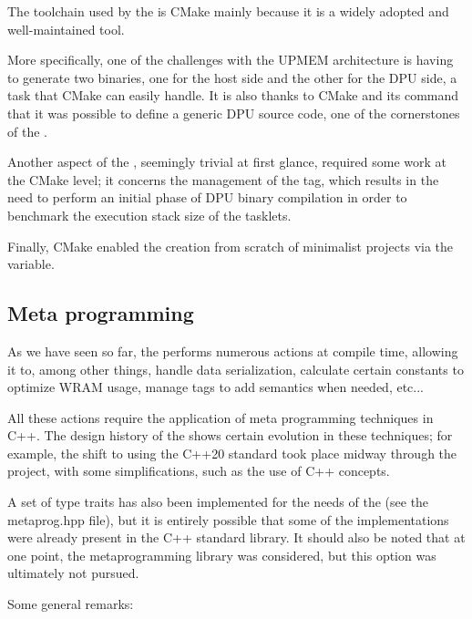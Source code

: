 The toolchain used by the \BPL is CMake mainly because it is a widely adopted and well-maintained tool.

More specifically, one of the challenges with the UPMEM architecture is having to generate two binaries, one for the host side and the other for the DPU side, a task that CMake can easily handle. It is also thanks to CMake and its  command that it was possible to define a generic DPU source code, one of the cornerstones of the \BPL.

Another aspect of the \BPL, seemingly trivial at first glance, required some work at the CMake level; it concerns the management of the  tag, which results in the need to perform an initial phase of DPU binary 
compilation in order to benchmark the execution stack size of the tasklets.

Finally, CMake enabled the creation from scratch of minimalist \BPL projects via the  variable.

\subsection{Meta programming}

As we have seen so far, the \BPL performs numerous actions at compile time, allowing it to, among other things, handle data serialization, calculate certain constants to optimize WRAM usage,  manage tags to add semantics when needed, etc...

All these actions require the application of meta programming techniques in C++. 
The design history of the \BPL shows certain evolution in these techniques; 
for example, the shift to using the C++20 standard took place midway through the project, with some simplifications, such as the use of C++ concepts.

A set of type traits has also been implemented for the needs of the \BPL (see the metaprog.hpp file), but it is entirely possible that some of the implementations were already present in the C++ standard library.
It should also be noted that at one point, the  metaprogramming library was considered,  but this option was ultimately not pursued.

Some general remarks:

